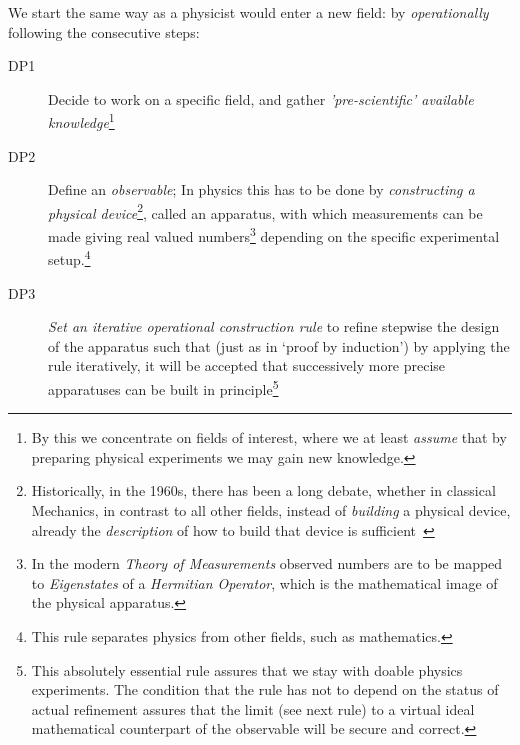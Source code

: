 We start the same way as a physicist would enter a new field: by {\emph{operationally}}
following the consecutive steps:
\begin{description}
\item[DP1] Decide to work on a specific field, and gather {\emph{'pre-scientific'
      available knowledge}}\footnote{By this we concentrate on fields of interest, where
    we at least {\emph{assume}} that by preparing physical experiments we may gain new
    knowledge.}
\item[DP2] Define an {\emph{observable}}; In physics this has to be done by
  {\emph{constructing a physical device}}\footnote{Historically, in the 1960s, there
    has been a long debate, whether in classical Mechanics, in contrast to all other
    fields, instead of {\emph{building}} a physical device, already the
    {\emph{description}} of how to build that device is
    sufficient~\cite{Mittelstaedt:buch}}, called an apparatus, with which measurements can
  be made giving real valued numbers\footnote{In the modern {\emph{Theory of
        Measurements}} observed numbers are to be mapped to {\emph{Eigenstates}} of a
    {\emph{Hermitian Operator}}, which is the mathematical image of the physical
    apparatus.} depending on the specific experimental setup.\footnote{This rule separates
    physics from other fields, such as mathematics.}
  
\item[DP3] {\emph{Set an iterative operational construction rule}} to refine stepwise the
  design of the apparatus such that (just as in `proof by induction') by applying the rule
  iteratively, it will be accepted that successively more precise apparatuses can be built
  in principle\footnote{This absolutely essential rule assures that we stay with doable
    physics experiments.  The condition that the rule has not to depend on the status of
    actual refinement assures that the limit (see next rule) to a virtual ideal
    mathematical counterpart of the observable will be secure and correct.}
  

\end{description}
